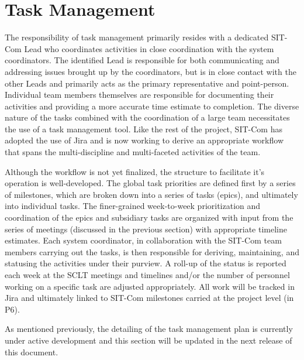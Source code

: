 \documentclass[SE,lsstdraft,authoryear,toc]{lsstdoc}
\begin{document}
\section{Task Management}
\label{sec:task_management}

The responsibility of task management primarily resides with a dedicated SIT-Com Lead who coordinates activities in close coordination with the system coordinators.
The identified Lead is responsible for both communicating and addressing issues brought up by the coordinators, but is in close contact with the other Leads and primarily acts as the primary representative and point-person.
Individual team members themselves are responsible for documenting their activities and providing a more accurate time estimate to completion.
The diverse nature of the tasks combined with the coordination of a large team necessitates the use of a task management tool.
Like the rest of the project, SIT-Com has adopted the use of Jira and is now working to derive an appropriate workflow that spans the multi-discipline and multi-faceted activities of the team.

Although the workflow is not yet finalized, the structure to facilitate it's operation is well-developed.
The global task priorities are defined first by a series of milestones, which are broken down into a series of tasks (epics), and ultimately into individual tasks.
The finer-grained week-to-week prioritization and coordination of the epics and subsidiary tasks are organized with input from the series of meetings (discussed in the previous section) with appropriate timeline estimates.
Each system coordinator, in collaboration with the SIT-Com team members carrying out the tasks, is then responsible for deriving, maintaining, and statusing the activities under their purview.
A roll-up of the status is reported each week at the SCLT meetings and timelines and/or the number of personnel working on a specific task are adjusted appropriately.
All work will be tracked in Jira and ultimately linked to SIT-Com milestones carried at the project level (in P6).

As mentioned previously, the detailing of the task management plan is currently under active development and this section will be updated in the next release of this document.
\end{document}
